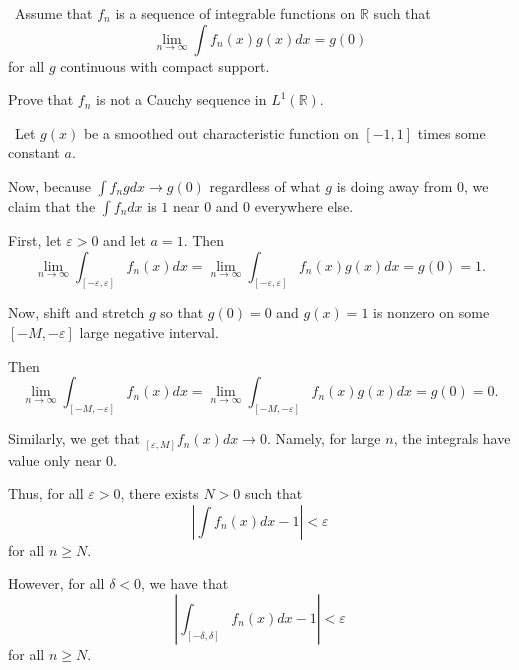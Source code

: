 \documentclass[12pt]{Qual}
\begin{document}
\begin{problem} $\,$
Assume that $f_n$ is a sequence of integrable functions on $\mathbb{R}$ such that $$\lim_{n\to\infty}\int f_n(x)g(x)dx=g(0)$$ for all $g$ continuous with compact support.

Prove that $f_n$ is not a Cauchy sequence in $L^1(\mathbb{R}).$
\end{problem}


\begin{solution}$\,$
Let $g(x)$ be a smoothed out characteristic function on $[-1,1]$ times some constant $a.$

\begin{center}
\end{center}

Now, because $\int f_ngdx\to g(0)$ regardless of what $g$ is doing away from $0$, we claim that the $\int f_ndx$ is $1$ near $0$ and $0$ everywhere else.

First, let $\varepsilon>0$ and let $a=1$. Then $$\lim_{n\to\infty}\int_{[-\varepsilon,\varepsilon]}f_n(x)dx=\lim_{n\to\infty}\int_{[-\varepsilon,\varepsilon]}f_n(x)g(x)dx=g(0)=1.$$

Now, shift and stretch $g$ so that $g(0)=0$ and $g(x)=1$ is nonzero on some $[-M,-\varepsilon]$ large negative interval.

Then $$\lim_{n\to\infty}\int_{[-M,-\varepsilon]}f_n(x)dx=\lim_{n\to\infty}\int_{[-M,-\varepsilon]}f_n(x)g(x)dx=g(0)=0.$$

Similarly, we get that $\displaystyle_{[\varepsilon,M]}f_n(x)dx\to 0$. Namely, for large $n$, the integrals have value only near $0.$

Thus, for all $\varepsilon>0$, there exists $N>0$ such that $$\left|\int f_n(x)dx-1\right|<\varepsilon$$ for all $n\ge N.$

However, for all $\delta<0$, we have that $$\left|\int_{[-\delta,\delta]} f_n(x)dx-1\right|<\varepsilon$$ for all $n\ge N.$


\end{solution}
\end{document}

